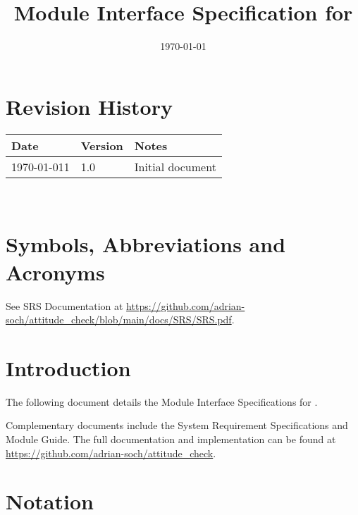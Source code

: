 \documentclass[12pt, titlepage]{article}
\begin{document}
\title{Module Interface Specification for \progname{}}

\author{\authname}

\date{\today}

\maketitle


\section{Revision History}

\begin{tabularx}{\textwidth}{p{3cm}p{2cm}X} \toprule {\bf Date} & {\bf Version} & {\bf Notes}\\
\midrule
\today 1 & 1.0 & Initial document\\
\bottomrule
\end{tabularx}

~\newpage

\section{Symbols, Abbreviations and Acronyms}

See SRS Documentation at
\url{https://github.com/adrian-soch/attitude_check/blob/main/docs/SRS/SRS.pdf}.


\newpage

\tableofcontents

\newpage


\section{Introduction}

The following document details the Module Interface Specifications for \progname.

Complementary documents include the System Requirement Specifications and Module Guide.  The full
documentation and implementation can be found at
\url{https://github.com/adrian-soch/attitude_check}.  

\section{Notation}
\end{document}
